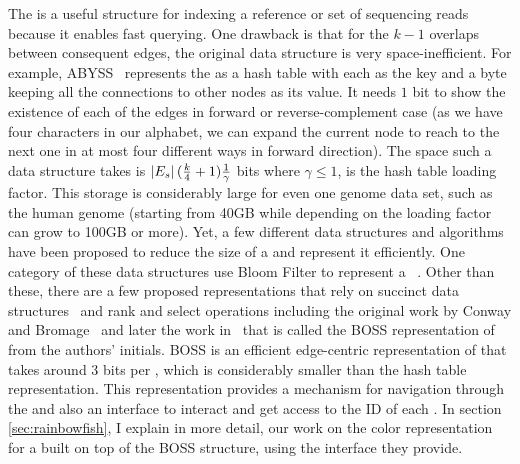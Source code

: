The \dbg is a useful structure for indexing a reference or set of sequencing reads because it enables fast querying. One drawback is that for the $k-1$ overlaps between consequent edges, the original data structure is very space-inefficient. For example, ABYSS~\cite{simpson2009abyss} represents the \dbg as a hash table with each \kmer as the key and a byte keeping all the connections to other nodes as its value. It needs $1$ bit to show the existence of each of the edges in forward or reverse-complement case (as we have four characters in our alphabet, we can expand the current node to reach to the next one in at most four different ways in forward direction). The space such a data structure takes is $\left|E_s\right|(\frac{k}{4}+1)\frac{1}{\gamma}$ bits where $\gamma \leq 1$, is the hash table loading factor. This storage is considerably large for even one genome data set, such as the human genome (starting from 40GB while depending on the loading factor can grow to 100GB or more). Yet, a few different data structures and algorithms have been proposed to reduce the size of a \dbg and represent it efficiently. One category of these data structures use Bloom Filter to represent a \dbg~\cite{pell2012scaling,salikhov2013using,chikhi2012space,chikhi2013space,holley2016bloom}. Other than these, there are a few proposed representations that rely on succinct data structures~\cite{gbmp2014sea} and rank and select operations including the original work by Conway and Bromage~\cite{conway2011succinct} and later the work in~\cite{BoweOn12} that is called the BOSS representation of \dbg from the authors’ initials. BOSS is an efficient edge-centric representation of \dbg that takes around 3 bits per \kmer, which is considerably smaller than the hash table representation. This representation provides a mechanism for navigation through the \dbg and also an interface to interact and get access to the ID of each \kmer. In section \ref{sec:rainbowfish}, I explain in more detail, our work on the color representation for a \dbg built on top of the BOSS structure, using the interface they provide.


